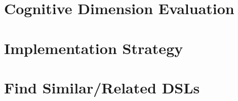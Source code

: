 \documentclass[11pt]{article}
\begin{document}

%

\section{Cognitive Dimension Evaluation}
\label{sec:cogdim}




\section{Implementation Strategy}
\label{sec:implementation}




\section{Find Similar/Related DSLs}
\label{sec:related}


\end{document}
